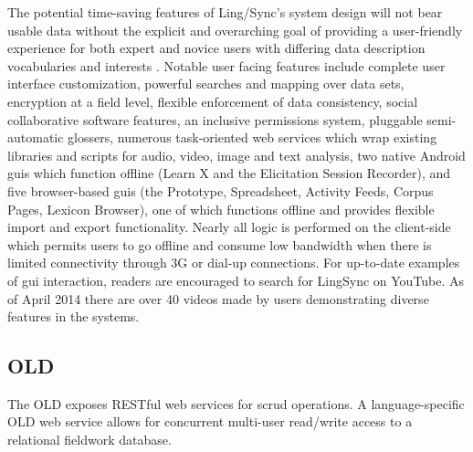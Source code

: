 \documentclass[11pt]{article}
\begin{document}
The potential time-saving features of Ling\-/Sync's system design will not bear
usable data without the explicit and overarching goal of providing a
user-friendly experience for both expert and novice users with differing data
description vocabularies and interests \cite{Troy:2014}.  Notable user facing
features include complete user interface customization, powerful searches and mapping over
data sets, encryption at a field level, flexible enforcement of data
consistency, social collaborative software features, an inclusive permissions
system, pluggable 
semi-automatic glossers, numerous task-oriented web services which wrap
existing libraries and scripts for audio, video, image and text analysis, two
native Android \glspl{gui} which function offline (Learn X and the Elicitation
Session Recorder), and five browser-based \glspl{gui} (the Prototype,
Spreadsheet,  Activity Feeds, Corpus Pages, Lexicon Browser), one of which
functions offline and provides flexible import and export functionality. 
%
%
Nearly all logic is performed on
the client-side which permits users to go offline and consume low bandwidth
when there is limited connectivity through 3G or dial-up connections.
%
For
up-to-date examples of \gls{gui} interaction, readers are encouraged to search
for LingSync on YouTube. As of April 2014 there are over 40 videos made by
users demonstrating diverse features in the systems.

\subsection{OLD}\label{sec:old}

The OLD  exposes RESTful web services for \gls{scrud} operations. A
language-specific OLD web service allows for concurrent multi-user read/write
access to a relational fieldwork database.
\end{document}

